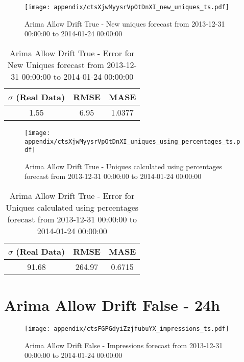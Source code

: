\begin{figure}[H] \begin{center} \leavevmode
\texttt{[image: appendix/ctsXjwMyysrVpOtDnXI\_new\_uniques\_ts.pdf]} \caption[]{
Arima Allow Drift True - New uniques forecast from 2013-12-31 00:00:00 to 2014-01-24 00:00:00} \label{fig:appendix/ctsXjwMyysrVpOtDnXI_new_uniques_ts.pdf} \end{center}
\end{figure}

\begin{table}[H]
\centering
\footnotesize
\begin{tabular}{ccc}
$\sigma$ (Real Data) & RMSE & MASE   \\ \hline
1.55 & 6.95 & 1.0377 \\
\end{tabular}

\vspace{0.5cm}

\caption[]{
Arima Allow Drift True - Error for New Uniques forecast from 2013-12-31 00:00:00 to 2014-01-24 00:00:00}
\end{table}

\begin{figure}[H] \begin{center} \leavevmode
\texttt{[image: appendix/ctsXjwMyysrVpOtDnXI\_uniques\_using\_percentages\_ts.pdf]} \caption[]{
Arima Allow Drift True - Uniques calculated using percentages forecast from 2013-12-31 00:00:00 to 2014-01-24 00:00:00} \label{fig:appendix/ctsXjwMyysrVpOtDnXI_uniques_using_percentages_ts.pdf} \end{center}
\end{figure}

\begin{table}[H]
\centering
\footnotesize
\begin{tabular}{ccc}
$\sigma$ (Real Data) & RMSE & MASE   \\ \hline
91.68 & 264.97 & 0.6715 \\
\end{tabular}

\vspace{0.5cm}

\caption[]{
Arima Allow Drift True - Error for Uniques calculated using percentages forecast from 2013-12-31 00:00:00 to 2014-01-24 00:00:00}
\end{table}

\section{Arima Allow Drift False - 24h}
\begin{figure}[H] \begin{center} \leavevmode
\texttt{[image: appendix/ctsFGPGdyiZzjfubuYX\_impressions\_ts.pdf]} \caption[]{
Arima Allow Drift False - Impressions forecast from 2013-12-31 00:00:00 to 2014-01-24 00:00:00} \label{fig:appendix/ctsFGPGdyiZzjfubuYX_impressions_ts.pdf} \end{center}
\end{figure}

